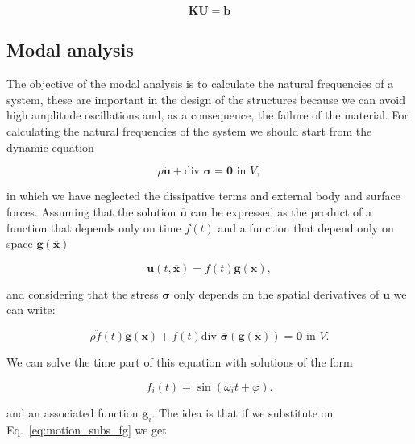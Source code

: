\documentclass[3p]{elsarticle}
\begin{document}
\begin{equation}
\bm{K}\bm{U} = \bm{b}
\label{eq:equil_matricial}
\end{equation}


\subsection{Modal analysis}

The objective of the modal analysis is to calculate the natural frequencies
of a system, these are important in the design of the structures because we can avoid 
high amplitude oscillations and, as a consequence, the failure of the material. 
For calculating the natural frequencies of the system we should start from the
dynamic equation  

\begin{equation}
\rho \ddot{\bm{u}} + \text{div } \bm{\sigma} = \bm{0} \text{ in } V,
\label{eq:motion}
\end{equation}

\noindent
in which we have neglected the dissipative terms and external body and surface
forces.
Assuming that the solution $\overline{\bm{u}}$ can be expressed as the
product of a function that depends only on time $f(t)$ and a function that
depend only on space $\bm{g}(\overline{\bm{x}})$ 

\begin{equation}
\bm{u}(t,\overline{\bm{x}}) = f(t) \bm{g}(\bm{x}),
\label{eq:u_fg}
\end{equation}

\noindent
and considering that the stress $\bm{\sigma}$ only depends on the
spatial derivatives of $\bm{u}$ we can write:

\begin{equation}
\rho \ddot{f}(t) \bm{g}(\bm{x}) +
f(t) \text{div } \overline{\bm{\sigma}}(\bm{g}(\bm{x}))
= \bm{0} \text{ in } V.
\label{eq:motion_subs_fg}
\end{equation}

We can solve the time part of this equation with solutions of the form

\begin{equation}
f_i(t) = \sin (\omega_i t + \varphi).
\label{eq:f_sin}
\end{equation}

\noindent
and an associated function $\bm{g}_i$. The idea is that if we substitute 
on Eq.~\ref{eq:motion_subs_fg} we get
\end{document}
